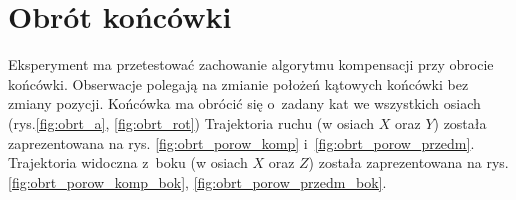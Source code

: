 

\section{Obrót końcówki}

Eksperyment ma przetestować zachowanie algorytmu kompensacji przy obrocie końcówki. Obserwacje polegają na zmianie położeń kątowych końcówki bez zmiany pozycji. Końcówka ma obrócić się o~zadany kat we wszystkich osiach (rys.\ref{fig:obrt_a}, \ref{fig:obrt_rot}) Trajektoria ruchu (w osiach $X$ oraz $Y$) została zaprezentowana na rys. \ref{fig:obrt_porow_komp} i~\ref{fig:obrt_porow_przedm}. Trajektoria widoczna z~boku (w osiach $X$ oraz $Z$) została zaprezentowana na rys. \ref{fig:obrt_porow_komp_bok}, \ref{fig:obrt_porow_przedm_bok}.

